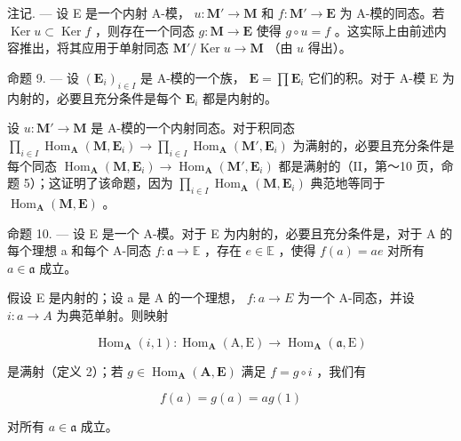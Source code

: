 注记. --- 设 E 是一个内射 A-模， \(u: \mathbf{M}' \to \mathbf{M}\) 和 \(f: \mathbf{M}' \to \mathbf{E}\) 为 A-模的同态。若 \(\operatorname{Ker} u \subset \operatorname{Ker} f\) ，则存在一个同态 \(g: \mathbf{M} \to \mathbf{E}\) 使得 \(g \circ u = f\) 。这实际上由前述内容推出，将其应用于单射同态 \(\mathbf{M}' / \operatorname{Ker} u \to \mathbf{M}\) （由 \(u\) 得出）。

命题 9. --- 设 \((\mathbf{E}_i)_{i\in I}\) 是 A-模的一个族， \(\mathbf{E} = \prod \mathbf{E}_i\) 它们的积。对于 A-模 E 为内射的，必要且充分条件是每个 \(\mathbf{E}_i\) 都是内射的。

设 \(u: \mathbf{M}' \to \mathbf{M}\) 是 A-模的一个内射同态。对于积同态 \(\prod_{i \in I} \operatorname{Hom}_{\mathbf{A}}(\mathbf{M}, \mathbf{E}_i) \to \prod_{i \in I} \operatorname{Hom}_{\mathbf{A}}(\mathbf{M}', \mathbf{E}_i)\) 为满射的，必要且充分条件是每个同态 \(\operatorname{Hom}_{\mathbf{A}}(\mathbf{M}, \mathbf{E}_i) \to \operatorname{Hom}_{\mathbf{A}}(\mathbf{M}', \mathbf{E}_i)\) 都是满射的（II，第～10 页，命题 5）；这证明了该命题，因为 \(\prod_{i \in I} \operatorname{Hom}_{\mathbf{A}}(\mathbf{M}, \mathbf{E}_i)\) 典范地等同于 \(\operatorname{Hom}_{\mathbf{A}}(\mathbf{M}, \mathbf{E})\) 。

命题 10. --- 设 E 是一个 A-模。对于 E 为内射的，必要且充分条件是，对于 A 的每个理想 a 和每个 A-同态 \(f: \mathfrak{a} \to \mathbb{E}\) ，存在 \(e \in \mathbb{E}\) ，使得 \(f(a) = ae\) 对所有 \(a \in \mathfrak{a}\) 成立。

假设 E 是内射的；设 a 是 A 的一个理想， \(f : a \to E\) 为一个 A-同态，并设 \(i : a \to A\) 为典范单射。则映射

\[
\operatorname{Hom} _ {\mathbf {A}} (i, 1): \operatorname{Hom} _ {\mathbf {A}} (\mathrm{A}, \mathrm{E}) \rightarrow \operatorname{Hom} _ {\mathbf {A}} (\mathfrak {a}, \mathrm{E})
\]

是满射（定义 2）；若 \(g \in \operatorname{Hom}_{\mathbf{A}}(\mathbf{A}, \mathbf{E})\) 满足 \(f = g \circ i\) ，我们有

\[
f (a) = g (a) = a g (1)
\]

对所有 \(a \in \mathfrak{a}\) 成立。

